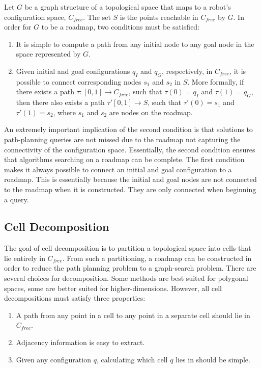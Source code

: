 \documentclass[10pt,conference]{ieeeconf}
\begin{document}
	Let $G$ be a graph structure of a topological space that maps to a robot's configuration space, $C_{free}$. The set $S$ is the points reachable in $C_{free}$ by $G$. In order for $G$ to be a roadmap, two conditions must be satisfied:
	\begin{enumerate}
	\item 
	It is simple to compute a path from any initial node to any goal node in the space represented by $G$.
	
	\item
	Given initial and goal configurations $q_I$ and $q_G$, respectively, in $C_{free}$, it is possible to connect corresponding nodes $s_1$ and $s_2$ in $S$. More formally, if there exists a path $\tau :[0,1] \rightarrow C_{free}$, such that $\tau (0)=q_I$ and $\tau (1)=q_G$, then there also exists a path $\tau'[0,1] \rightarrow S$, such that $\tau'(0)=s_1$ and $\tau'(1)=s_2$, where $s_1$ and $s_2$ are nodes on the roadmap.
	\end{enumerate}
	
	An extremely important implication of the second condition is that solutions to path-planning queries are not missed due to the roadmap not capturing the connectivity of the configuration space. Essentially, the second condition ensures that algorithms searching on a roadmap can be complete. The first condition makes it always possible to connect an initial and goal configuration to a roadmap. This is essentially because the initial and goal nodes are not connected to the roadmap when it is constructed. They are only connected when beginning a query.
	
\subsection{Cell Decomposition}

The goal of cell decomposition is to partition a topological space into cells that lie entirely in $C_{free}$. From such a partitioning, a roadmap can be constructed in order to reduce the path planning problem to a graph-search problem. There are several choices for decomposition. Some methods are best suited for polygonal spaces, some are better suited for higher-dimensions. However, all cell decompositions must satisfy three properties:

\begin{enumerate}
\item A path from any point in a cell to any point in a separate cell should lie in $C_{free}$.

\item Adjacency information is easy to extract.

\item Given any configuration $q$, calculating which cell $q$ lies in should be simple.
\end{enumerate}
\end{document}
